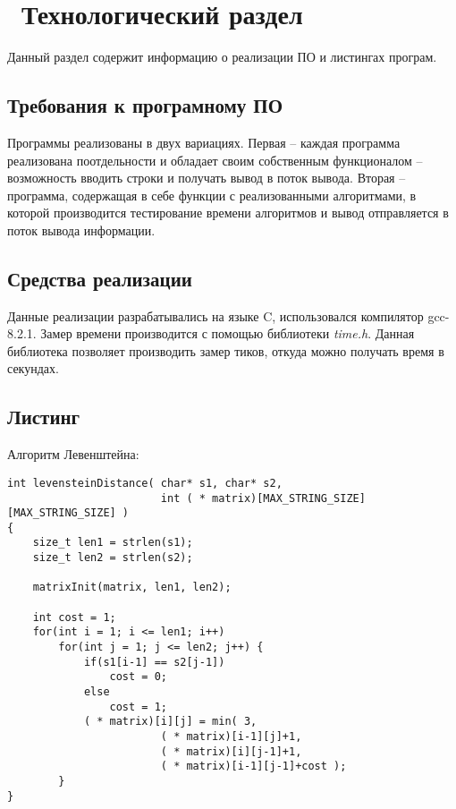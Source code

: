 \chapter{ Технологический раздел}
\label{cha:impl}

Данный раздел содержит информацию о реализации ПО и листингах програм.

\section{ Требования к програмному ПО}
Программы реализованы в двух вариациях. Первая -- каждая программа реализована поотдельности и обладает своим собственным функционалом -- возможность вводить строки и получать вывод в поток вывода. Вторая -- программа, содержащая в себе функции с реализованными алгоритмами, в которой производится тестирование времени алгоритмов и вывод отправляется в поток вывода информации.

\section{ Средства реализации }
Данные реализации разрабатывались на языке C, использовался компилятор gcc-8.2.1.
Замер времени производится с помощью библиотеки \textit{time.h}. Данная библиотека позволяет производить замер тиков, откуда можно получать время в секундах. 

\section{ Листинг}
Алгоритм Левенштейна: 
\begin{lstlisting}[style=CStyle]
int levensteinDistance( char* s1, char* s2,
                        int ( * matrix)[MAX_STRING_SIZE][MAX_STRING_SIZE] )
{
    size_t len1 = strlen(s1);
    size_t len2 = strlen(s2);

    matrixInit(matrix, len1, len2);

    int cost = 1;
    for(int i = 1; i <= len1; i++)
        for(int j = 1; j <= len2; j++) {
            if(s1[i-1] == s2[j-1])
                cost = 0;
            else
                cost = 1;
            ( * matrix)[i][j] = min( 3,
                        ( * matrix)[i-1][j]+1,
                        ( * matrix)[i][j-1]+1,
                        ( * matrix)[i-1][j-1]+cost );
        }
}
\end{lstlisting}

